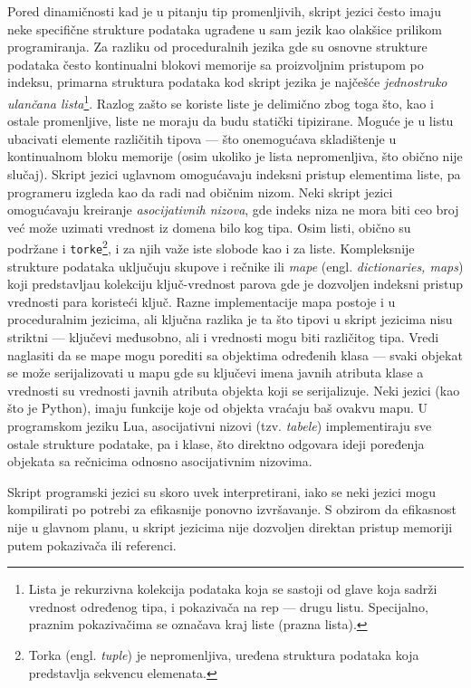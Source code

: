 Pored dinamičnosti kad je u pitanju tip promenljivih, skript jezici često imaju neke specifične strukture podataka ugrađene u sam jezik kao olakšice prilikom programiranja. Za razliku od proceduralnih jezika gde su osnovne strukture podataka često kontinualni blokovi memorije sa proizvoljnim pristupom po indeksu, primarna struktura podataka kod skript jezika je najčešće \emph{jednostruko ulančana lista}\footnote{Lista je rekurzivna kolekcija podataka koja se sastoji od glave koja sadrži vrednost određenog tipa, i pokazivača na rep --- drugu listu. Specijalno, praznim pokazivačima se označava kraj liste (prazna lista).}. Razlog zašto se koriste liste je delimično zbog toga što, kao i ostale promenljive, liste ne moraju da budu statički tipizirane. Moguće je u listu ubacivati elemente različitih tipova --- što onemogućava skladištenje u kontinualnom bloku memorije (osim ukoliko je lista nepromenljiva, što obično nije slučaj). Skript jezici uglavnom omogućavaju indeksni pristup elementima liste, pa programeru izgleda kao da radi nad običnim nizom. Neki skript jezici omogućavaju kreiranje \emph{asocijativnih nizova}, gde indeks niza ne mora biti ceo broj već može uzimati vrednost iz domena bilo kog tipa. Osim listi, obično su podržane i \texttt{torke}\footnote{Torka (engl. \emph{tuple}) je nepromenljiva, uređena struktura podataka koja predstavlja sekvencu elemenata.}, i za njih važe iste slobode kao i za liste. Kompleksnije strukture podataka uključuju skupove i rečnike ili \emph{mape} (engl. \emph{dictionaries, maps}) koji predstavljau kolekciju ključ-vrednost parova gde je dozvoljen indeksni pristup vrednosti para koristeći ključ. Razne implementacije mapa postoje i u proceduralnim jezicima, ali ključna razlika je ta što tipovi u skript jezicima nisu striktni --- ključevi međusobno, ali i vrednosti mogu biti različitog tipa. Vredi naglasiti da se mape mogu porediti sa objektima određenih klasa --- svaki objekat se može serijalizovati u mapu gde su ključevi imena javnih atributa klase a vrednosti su vrednosti javnih atributa objekta koji se serijalizuje. Neki jezici (kao što je Python), imaju funkcije koje od objekta vraćaju baš ovakvu mapu. U programskom jeziku Lua, asocijativni nizovi (tzv. \emph{tabele}) implementiraju sve ostale strukture podatake, pa i klase, što direktno odgovara ideji poređenja objekata sa rečnicima odnosno asocijativnim nizovima.

Skript programski jezici su skoro uvek interpretirani, iako se neki jezici mogu kompilirati po potrebi za efikasnije ponovno izvršavanje. S obzirom da efikasnost nije u glavnom planu, u skript jezicima nije dozvoljen direktan pristup memoriji putem pokazivača ili referenci. 



